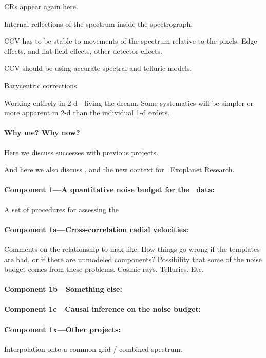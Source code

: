 \documentclass[12pt, fullpage, letterpaper]{article}
\begin{document}
CRs appear again here.

Internal reflections of the spectrum inside the spectrograph.

CCV has to be stable to movements of the spectrum relative to the
pixels. Edge effects, and flat-field effects, other detector effects.

CCV should be using accurate spectral and telluric models.

Barycentric corrections.

Working entirely in 2-d---living the dream. Some systematics will be
simpler or more apparent in 2-d than the individual 1-d orders.

\paragraph{Why me? Why now?}
Here we discuss successes with previous projects.

And here we also discuss \NNEXPLORE, and the new context for
\NASA\ Exoplanet Research.

\paragraph{Component 1---A quantitative noise budget for the \HARPS\ data:}
A set of procedures for assessing the 

\paragraph{Component 1a---Cross-correlation radial velocities:}
Comments on the relationship to max-like. How things go wrong
if the templates are bad, or if there are unmodeled components?
Possibility that some of the noise budget comes from these
problems. Cosmic rays. Tellurics. Etc.

\paragraph{Component 1b---Something else:}

\paragraph{Component 1c---Causal inference on the noise budget:}

\paragraph{Component 1x---Other projects:}
Interpolation onto a common grid / combined spectrum.
\end{document}
